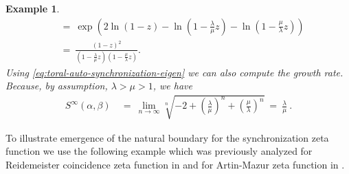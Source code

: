 \documentclass[oneside]{amsart}
\newtheorem{ex}[thm]{Example}
\begin{document}
\begin{ex}
\begin{align*}
    &= \ \exp \left( 2 \ln (1-z) - \ln \left(1 - \frac{\lambda}{\mu} z\right) - \ln\left(1 - \frac{\mu}{\lambda} z\right) \right) \\
    &= \ \frac{(1-z)^2}{\left(1 - \frac{\lambda}{\mu} z\right) \left(1 - \frac{\mu}{\lambda} z\right)}.
  \end{align*}
  Using \eqref{eq:toral-auto-synchronization-eigen} we can also compute the growth rate.
  Because, by assumption, $\lambda > \mu > 1$, we have
  \begin{align*}
    S^\infty(\alpha, \beta) \ &= \ \lim_{n \to \infty} \sqrt[n]{ -2 + \left( \frac{\lambda}{\mu} \right)^n + \left( \frac{\mu}{\lambda} \right)^n} \ = \ \frac{\lambda}{\mu} \ .
  \end{align*}
\end{ex}


To illustrate emergence of the natural boundary for the synchronization zeta function
we use the following example which was previously analyzed for
Reidemeister coincidence zeta function in \cite[Paragraph~4.3]{FelZie}
and for Artin-Mazur zeta function in \cite[Proposition~2]{EvStanWard}.
\end{document}
